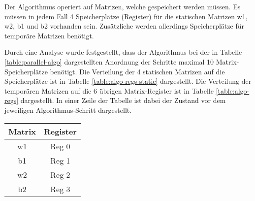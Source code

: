 \documentclass
[ 12pt,
  parskip=half %
]{scrreprt}
\begin{document}
Der Algorithmus operiert auf Matrizen, welche gespeichert werden müssen. Es müssen in jedem Fall 4 Speicherplätze (Register) für die statischen Matrizen w1, w2, b1 und b2 vorhanden sein. Zusätzliche werden allerdings Speicherplätze für temporäre Matrizen benötigt.

Durch eine Analyse wurde festgestellt, dass der Algorithmus bei der in Tabelle \ref{table:parallel-algo} dargestellten Anordnung der Schritte maximal 10 Matrix-Speicherplätze benötigt. Die Verteilung der 4 statischen Matrizen auf die Speicherplätze ist in Tabelle \ref{table:algo-regs-static} dargestellt. Die Verteilung der temporären Matrizen auf die 6 übrigen Matrix-Register ist in Tabelle \ref{table:algo-regs} dargestellt. In einer Zeile der Tabelle ist dabei der Zustand vor dem jeweiligen Algorithmus-Schritt dargestellt.

\begin{center}
	\begin{tabulary}{\columnwidth}{|C|C|}
		\hline
		Matrix & Register\\
		\hline
		w1 & Reg 0\\
		b1 & Reg 1\\
		w2 & Reg 2\\
		b2 & Reg 3\\
		\hline
	\end{tabulary}
	\label{table:algo-regs-static}
\end{center}
\end{document}
